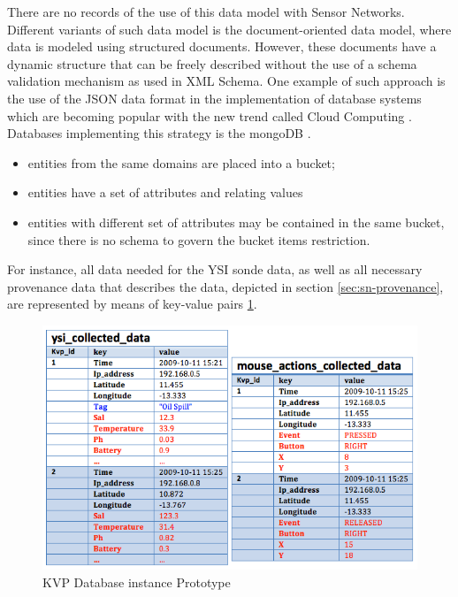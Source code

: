 There are no records of the use of this data model with Sensor Networks.
Different variants of such data model is the document-oriented data model,
where data is modeled using structured documents. However, these documents
have a dynamic structure that can be freely described without the use of a
schema validation mechanism as used in XML Schema. One example of such
approach is the use of the JSON data format \cite{json} in the implementation
of database systems which are becoming popular with the new trend called Cloud
Computing \cite{cloud-comp-architectures}. Databases implementing this
strategy is the mongoDB \cite{mongodb}.

\begin{itemize}
  \item entities from the same domains are placed into a bucket;
  \item entities have a set of attributes and relating values
  \item entities with different set of attributes may be contained in the same
  bucket, since there is no schema to govern the bucket items restriction.
\end{itemize}

For instance, all data needed for the YSI sonde data, as well as all necessary
provenance data that describes the data, depicted in section
\ref{sec:sn-provenance}, are represented by means of key-value pairs
\ref{fig:persistence-example-kvp}.

\begin{figure}[!h]
  \centering
  \includegraphics[scale=0.75]{../diagrams/persistence-example-kvp}
  \caption{KVP Database instance Prototype}
  \label{fig:persistence-example-kvp}
\end{figure}

